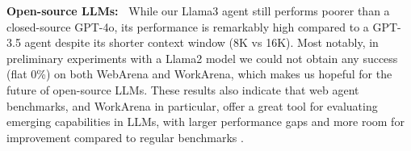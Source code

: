 \documentclass{article}
\theoremstyle{plain}
\theoremstyle{definition}
\theoremstyle{remark}
\newcommand{\paragraphtight}[1]{\textbf{#1~}}
\begin{document}
 
\paragraphtight{Open-source LLMs:} While our Llama3 agent still performs poorer than a closed-source GPT-4o, its performance is remarkably high compared to a GPT-3.5 agent despite its shorter context window (8K vs 16K). Most notably, in preliminary experiments with a Llama2 model we could not obtain any success (flat 0\%) on both WebArena and WorkArena, which makes us hopeful for the future of open-source LLMs. These results also indicate that web agent benchmarks, and WorkArena in particular, offer a great tool for evaluating emerging capabilities in LLMs, with larger performance gaps and more room for improvement compared to regular benchmarks \citep{llama2}.


\begin{table}[ht]
\caption{Ablation study for \textbf{GPT-4o} on MiniWoB and WorkArena. Success rate (SR ) of all configurations. Each row modifies the initial configuration.}
\noindent{}
\label{tab:ablation-gpt-4o}
\end{table}
\end{document}
